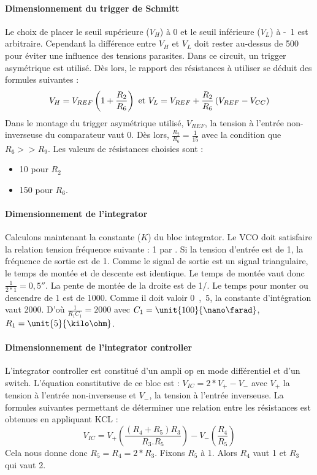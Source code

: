 \paragraph{Dimensionnement du trigger de Schmitt}
Le choix de placer le seuil supérieure ($V_H$) à \unit{0}{\volt} et le seuil inférieure ($V_L$) à \unit{-1}{\volt} est arbitraire. Cependant la différence entre $V_H$ et $V_L$ doit rester au-dessus de \unit{500}{\milli\volt} pour éviter une influence des tensions parasites. Dans ce circuit, un trigger asymétrique est utilisé. Dès lors, le rapport des résistances à utiliser se déduit des formules suivantes : 
$$V_H=V_{REF}\left(1+\frac{R_2}{R_6}\right) \textmd{ et } V_L=V_{REF} + \frac{R_2}{R_6}\left(V_{REF}-V_{CC}\right)$$
Dans le montage du trigger asymétrique utilisé, $V_{REF}$, la tension à l'entrée non-inverseuse du comparateur vaut \unit{0}{\volt}. Dès lors, $\frac{R_2}{R_6}=\frac{1}{15}$
avec la condition que $R_6>>R_9$. Les valeurs de résistances choisies sont :
\begin{itemize}
\item \unit{10}{\kilo\ohm} pour $R_2$
\item \unit{150}{\kilo\ohm} pour $R_6$.
\end{itemize}

\paragraph{Dimensionnement de l'integrator}
Calculons maintenant la constante ($K$) du bloc integrator. Le VCO doit satisfaire la relation tension fréquence suivante : \unit{1}{\milli\volt} par \unit{}{\hertz}. Si la tension d'entrée est de \unit{1}{\milli\volt}, la fréquence de sortie est de \unit{1}{\hertz}. Comme le signal de sortie est un signal triangulaire, le temps de montée et de descente est identique. Le temps de montée vaut donc $\frac{1}{2*1} =  \unit{0,5}{\second}$. La pente de montée de la droite est de \unit{1}{\milli\volt}/\unit{}{\second}. Le temps pour monter ou descendre de \unit{1}{\volt} est de \unit{1000}{\second}. Comme il doit valoir \unit{0,5}{\second}, la constante d'intégration vaut 2000. D'où $\frac{1}{R_1C_1}=2000$ avec $C_1= \unit{100}{\nano\farad}$, $R_1 = \unit{5}{\kilo\ohm}$.
\paragraph{Dimensionnement de l'integrator controller}
L'integrator controller est constitué d'un ampli op en mode différentiel et d'un switch. L'équation constitutive de ce bloc est : $V_{IC}=2*V_+ - V_-$ avec $V_+$ la tension à l'entrée non-inverseuse et $V_-$, la tension à l'entrée inverseuse. La formules suivantes permettant de déterminer une relation entre les résistances est obtenues en appliquant KCL : $$V_{IC}=V_+ \left(\frac{\left(R_4 + R_5\right)R_3}{R_3.R_5}\right)-V_-\left(\frac{R_4}{R_5}\right)$$ Cela nous donne donc $R_5 = R_4 = 2*R_3$.
Fixons $R_5$ à \unit{1}{\kilo\ohm}. Alors $R_4$ vaut \unit{1}{\kilo\ohm} et $R_3$ qui vaut \unit{2}{\kilo\ohm}.

